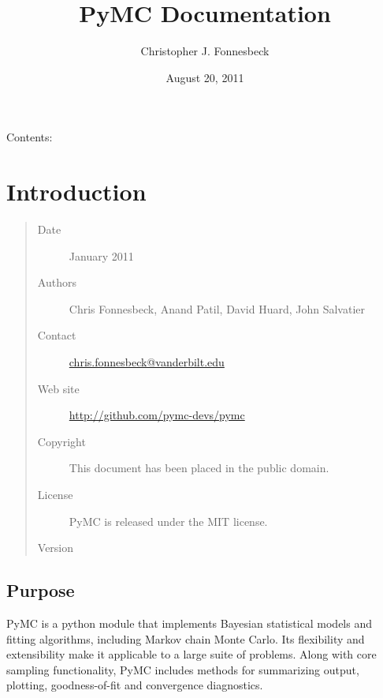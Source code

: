 \documentclass[letterpaper,10pt,english]{sphinxmanual}
\title{PyMC Documentation}
\date{August 20, 2011}
\author{Christopher J. Fonnesbeck}
\begin{document}
\maketitle
\tableofcontents
{}\label{index::doc}


Contents:


\chapter{Introduction}
\label{README:introduction}\label{README::doc}\label{README:pymc-user-s-guide}\begin{quote}\begin{description}
\item[{Date}]  January 2011

\item[{Authors}] \leavevmode
Chris Fonnesbeck, Anand Patil, David Huard, John Salvatier

\item[{Contact}] \leavevmode
\href{mailto:chris.fonnesbeck@vanderbilt.edu}{chris.fonnesbeck@vanderbilt.edu}

\item[{Web site}] \leavevmode
\href{http://github.com/pymc-devs/pymc}{http://github.com/pymc-devs/pymc}

\item[{Copyright}] \leavevmode
This document has been placed in the public domain.

\item[{License}] \leavevmode
PyMC is released under the MIT license.

\item[{Version}] 

\end{description}\end{quote}


\section{Purpose}
\label{README:purpose}
PyMC is a python module that implements Bayesian statistical models and
fitting algorithms, including Markov chain Monte Carlo.
Its flexibility and extensibility make it applicable to a large suite of problems. Along with core sampling functionality, PyMC includes
methods for summarizing output, plotting, goodness-of-fit and convergence
diagnostics.
\end{document}
